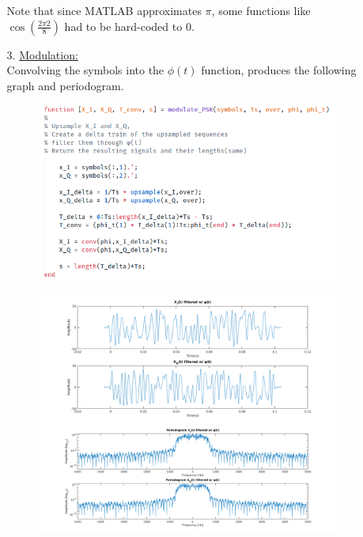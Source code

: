 \documentclass[12pt, a4paper]{article}
\begin{document}
\begin{enumerate}
\begin{enumerate}
\begin{figure}[H]
            \end{figure}
            Note that since MATLAB approximates \(\pi \), some functions like \(\cos(\frac{2\pi2}{8})\) had to be hard-coded to 0.
        \item[3.] \underline{Modulation:}\\
        Convolving the symbols into the \(\phi(t)\) function, produces the following 
        graph and periodogram.
        \begin{figure}[H]
            \centering
            \includegraphics[scale=0.8]{mod_fil.png}
        \end{figure}
        \begin{figure}[H]
            \centering
            \includegraphics[width=\textwidth]{filter_first.png}
            \includegraphics[width=\textwidth]{perio_filter.png}

\end{figure}
\end{enumerate}
\end{enumerate}
\end{document}
